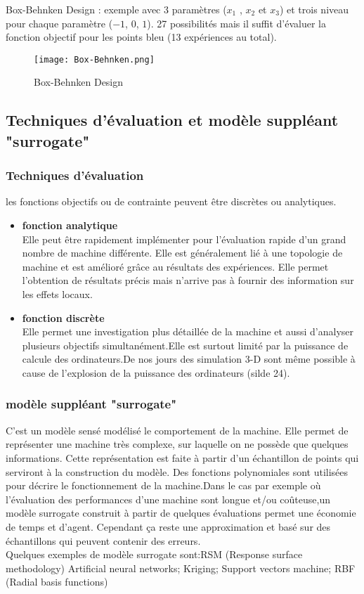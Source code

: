 Box-Behnken Design : exemple avec 3 paramètres ($x_1$ , $x_2$ et $x_3$) et trois niveau pour chaque paramètre ($-1$, $0$, $1$). 27 possibilités mais il suffit d’évaluer la fonction objectif pour les points bleu (13 expériences au total).

\begin{figure}[H]
    \centering
    \texttt{[image: Box-Behnken.png]}
    \caption{Box-Behnken Design}
\end{figure}
\subsection{Techniques d'évaluation et modèle suppléant "surrogate"}
\subsubsection*{Techniques d'évaluation}
les fonctions objectifs ou de contrainte peuvent être discrètes ou analytiques. 
\begin{itemize}

    \item \textbf{fonction analytique}\\
    Elle peut être rapidement implémenter pour l'évaluation rapide d'un grand nombre de machine différente. Elle est généralement lié à une topologie de machine et est amélioré grâce au résultats des expériences. Elle permet l'obtention de résultats précis mais n'arrive pas à fournir des information sur les effets locaux.
    \item \textbf{fonction discrète} \\
    Elle permet une investigation plus détaillée de la machine et aussi d'analyser plusieurs objectifs simultanément.Elle est surtout limité par la puissance de calcule des ordinateurs.De nos jours des simulation 3-D sont même possible à cause de l'explosion de la puissance des ordinateurs (silde 24).
\end{itemize}
\subsubsection*{ modèle suppléant "surrogate"}
C'est un modèle sensé modélisé le comportement de la machine. Elle permet de représenter une machine très complexe, sur laquelle on ne possède que quelques informations. Cette représentation est faite à partir d'un échantillon de points qui serviront à la construction du modèle. Des fonctions polynomiales sont utilisées pour décrire le fonctionnement de la machine.Dans le cas par exemple où l'évaluation des performances d'une machine sont longue et/ou coûteuse,un modèle surrogate construit à partir de quelques évaluations permet une économie de temps et d'agent. Cependant ça reste une approximation et basé sur des échantillons qui peuvent contenir des erreurs. \\ Quelques exemples de modèle surrogate sont:RSM (Response surface methodology)
Artificial neural networks; Kriging; Support vectors machine; RBF (Radial basis functions)
